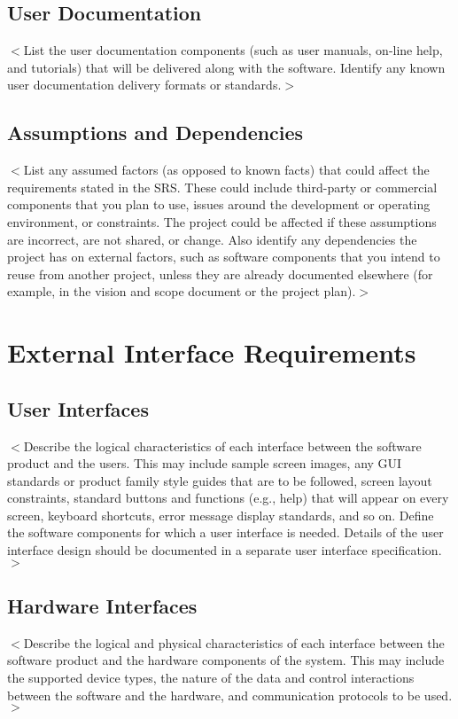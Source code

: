 \documentclass{scrreprt}
\begin{document}
\section{User Documentation}
$<$List the user documentation components (such as user manuals, on-line help, 
and tutorials) that will be delivered along with the software. Identify any 
known user documentation delivery formats or standards.$>$
\section{Assumptions and Dependencies}

$<$List any assumed factors (as opposed to known facts) that could affect the 
requirements stated in the SRS. These could include third-party or commercial 
components that you plan to use, issues around the development or operating 
environment, or constraints. The project could be affected if these assumptions 
are incorrect, are not shared, or change. Also identify any dependencies the 
project has on external factors, such as software components that you intend to 
reuse from another project, unless they are already documented elsewhere (for 
example, in the vision and scope document or the project plan).$>$


\chapter{External Interface Requirements}

\section{User Interfaces}
$<$Describe the logical characteristics of each interface between the software 
product and the users. This may include sample screen images, any GUI standards 
or product family style guides that are to be followed, screen layout 
constraints, standard buttons and functions (e.g., help) that will appear on 
every screen, keyboard shortcuts, error message display standards, and so on.  
Define the software components for which a user interface is needed. Details of 
the user interface design should be documented in a separate user interface 
specification.$>$

\section{Hardware Interfaces}
$<$Describe the logical and physical characteristics of each interface between 
the software product and the hardware components of the system. This may include 
the supported device types, the nature of the data and control interactions 
between the software and the hardware, and communication protocols to be 
used.$>$
\end{document}
